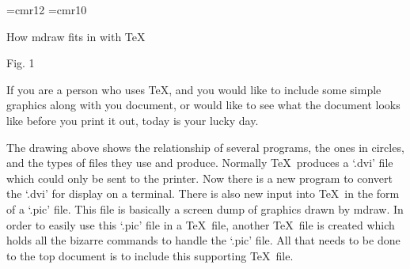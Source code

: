 \font\romanlarge=cmr12
\font\romannormal=cmr10
\romanlarge
\centerline{How mdraw fits in with \TeX}
\smallskip
\romannormal
\centerline{ }
\centerline{Fig. 1}
\medskip
If you are a person who uses \TeX , and you would like to include some simple
graphics along with you document, or would like to see what the document looks
like before you print it out, today is your lucky day.

The drawing above shows the relationship of several programs, the ones in
circles, and the types of files they use and produce. Normally \TeX\ produces a
`.dvi' file which could only be sent to the printer. Now there is a new program
to convert the `.dvi' for display on a terminal. There is also new input into
\TeX\ in the form of a `.pic' file. This file is basically a screen dump of
graphics drawn by mdraw. In order to easily use this `.pic' file in a \TeX\
file, another \TeX\ file is created which holds all the bizarre commands to 
handle the `.pic' file. All that needs to be done to the top document is 
to include this supporting \TeX\ file. 
\bye
